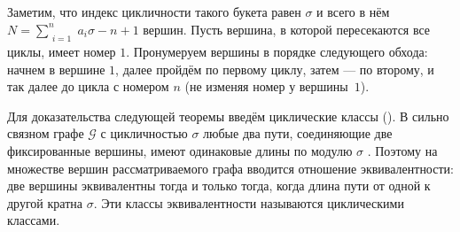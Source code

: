 \documentclass[12pt]{article}
\theoremstyle{definition}
\begin{document}
Заметим, что индекс цикличности такого букета равен $\sigma$ и всего в нём $N = \sum\limits_{\substack{i=1}}^n a_i\sigma - n + 1$ вершин. Пусть вершина, в которой пересекаются все циклы, имеет номер $1$. Пронумеруем вершины в порядке следующего обхода: начнем в вершине $1$, далее пройдём по первому циклу, затем --- по второму, и так далее до цикла с номером $n$ (не изменяя номер у вершины~$1$).

Для доказательства следующей теоремы введём циклические классы (\cite[раздел 3.3]{maxAlgebraicPowers}). В сильно связном графе $\mathcal{G}$ с цикличностью $\sigma$ любые два пути, соединяющие две фиксированные вершины, имеют одинаковые длины по модулю $\sigma$ . Поэтому на множестве вершин рассматриваемого графа вводится отношение эквивалентности: две вершины эквивалентны тогда и только тогда, когда длина пути от одной к другой кратна $\sigma$. Эти классы эквивалентности называются циклическими классами.
\end{document}
